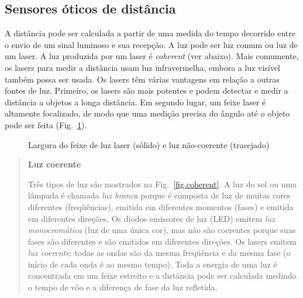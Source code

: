 \subsection{Sensores óticos de distância}\label{s.optical-distance}

A distância pode ser calculada a partir de uma medida do tempo decorrido entre o envio de um sinal luminoso e sua recepção. A luz pode ser luz comum ou luz de um laser. A luz produzida por um laser é \emph{coherent} (ver abaixo).  Mais comumente, os lasers para medir a distância usam luz infravermelha, embora a luz visível também possa ser usada. Os lasers têm várias vantagens em relação a outras fontes de luz. Primeiro, os lasers são mais potentes e podem detectar e medir a distância a objetos a longa distância. Em segundo lugar, um feixe laser é altamente focalizado, de modo que uma medição precisa do ângulo até o objeto pode ser feita (Fig.~\ref{fig.beam}).

\begin{figure}
\begin{center}
\end{center}
\caption{Largura do feixe de luz laser (sólido) e luz não-coerente (tracejado)}\label{fig.beam}
\end{figure}

\begin{quote}
\begin{center}
\textbf{Luz coerente}
\end{center}
Três tipos de luz são mostrados na Fig.~\ref{fig.coherent}. A luz do sol ou uma lâmpada é chamada \emph{luz branca} porque é composta de luz de muitas cores diferentes (freqüências), emitida em diferentes momentos (fases) e emitida em diferentes direções. Os diodos emissores de luz (LED) emitem \emph{luz monocromática} (luz de uma única cor), mas não são coerentes porque suas fases são diferentes e são emitidos em diferentes direções. Os lasers emitem \emph{luz coerente}: todas as ondas são da mesma freqüência e da mesma fase (o início de cada onda é ao mesmo tempo). Toda a energia de uma luz é concentrada em um feixe estreito e a distância pode ser calculada medindo o tempo de vôo e a diferença de fase da luz refletida.
\end{quote}

